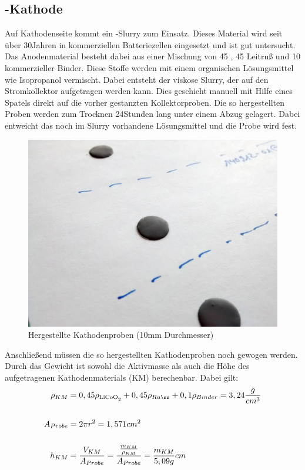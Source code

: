 \documentclass[a4paper, 11pt, headsepline,footsepline,twoside,abstract]{scrbook}
\begin{document}
\subsection{-Kathode}
Auf Kathodenseite kommt ein -Slurry zum Einsatz. Dieses Material wird seit über 30\;Jahren in kommerziellen Batteriezellen eingesetzt und ist gut untersucht. Das Anodenmaterial besteht dabei aus einer Mischung von \SI{45}{\masspercent} ,  \SI{45}{\masspercent} Leitruß und  \SI{10}{\masspercent} kommerzieller Binder. Diese Stoffe werden mit einem organischen Lösungsmittel wie Isopropanol vermischt. Dabei entsteht der viskose Slurry, der auf den Stromkollektor aufgetragen werden kann. Dies geschieht manuell mit Hilfe eines Spatels direkt auf die vorher gestanzten Kollektorproben. Die so hergestellten Proben werden zum Trocknen 24\;Stunden lang unter einem Abzug gelagert. Dabei entweicht das noch im Slurry vorhandene Lösungsmittel und die Probe wird fest.
\begin{figure}[]
	\centering
	\includegraphics[width=1.0\columnwidth]{images/Kathodenprobe.jpg}
	\caption{Hergestellte Kathodenproben (10mm Durchmesser)}
	\label{kathodenproben}
\end{figure}
Anschließend müssen die so hergestellten Kathodenproben noch gewogen werden. Durch das Gewicht ist sowohl die Aktivmasse als auch die Höhe des aufgetragenen Kathodenmaterials (KM) berechenbar. Dabei gilt:
\begin{equation}
\begin{split}
\rho_{KM} &= 0,45 \rho_{\ce{LiCoO2}} + 0,45 \rho_{Ruß} + 0,1 \rho_{Binder} = 3,24 \frac{g}{cm^3}\\\\
A_{Probe} &= 2 \pi r^2 = 1,571cm^2  \\\\
h_{KM} &= \frac{V_{KM}}{A_{Probe}} = \frac{\frac{m_{KM}}{\rho_{KM}}}{A_{Probe}} =  \frac{m_{KM}}{5,09g}cm\\\\
\end{split}
\end{equation}
\end{document}
